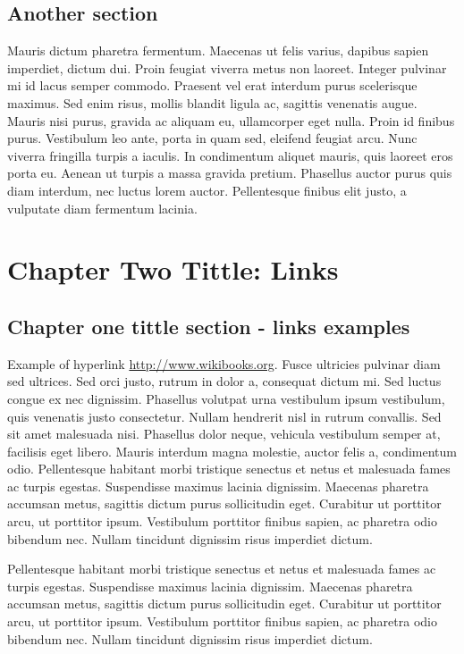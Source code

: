 \section{Another section}
Mauris dictum pharetra fermentum. Maecenas ut felis varius, dapibus sapien imperdiet, dictum dui. Proin feugiat viverra metus non laoreet. Integer pulvinar mi id lacus semper commodo. Praesent vel erat interdum purus scelerisque maximus. Sed enim risus, mollis blandit ligula ac, sagittis venenatis augue. Mauris nisi purus, gravida ac aliquam eu, ullamcorper eget nulla. Proin id finibus purus. Vestibulum leo ante, porta in quam sed, eleifend feugiat arcu. Nunc viverra fringilla turpis a iaculis. In condimentum aliquet mauris, quis laoreet eros porta eu. Aenean ut turpis a massa gravida pretium. Phasellus auctor purus quis diam interdum, nec luctus lorem auctor. Pellentesque finibus elit justo, a vulputate diam fermentum lacinia. 

\chapter{Chapter Two Tittle: Links}
\section{Chapter one tittle section - links examples}
Example of hyperlink \url{http://www.wikibooks.org}. Fusce ultricies pulvinar diam sed ultrices. Sed orci justo, rutrum in dolor a, consequat dictum mi. Sed luctus congue ex nec dignissim. Phasellus volutpat urna vestibulum ipsum vestibulum, quis venenatis justo consectetur. Nullam hendrerit nisl in rutrum convallis. Sed sit amet malesuada nisi. Phasellus dolor neque, vehicula vestibulum semper at, facilisis eget libero. Mauris interdum magna molestie, auctor felis a, condimentum odio. Pellentesque habitant morbi tristique senectus et netus et malesuada fames ac turpis egestas. Suspendisse maximus lacinia dignissim. Maecenas pharetra accumsan metus, sagittis dictum purus sollicitudin eget. Curabitur ut porttitor arcu, ut porttitor ipsum. Vestibulum porttitor finibus sapien, ac pharetra odio bibendum nec. Nullam tincidunt dignissim risus imperdiet dictum.

Pellentesque habitant morbi tristique senectus et netus et malesuada fames ac turpis egestas. Suspendisse maximus lacinia dignissim. Maecenas pharetra accumsan metus, sagittis dictum purus sollicitudin eget. Curabitur ut porttitor arcu, ut porttitor ipsum. Vestibulum porttitor finibus sapien, ac pharetra odio bibendum nec. Nullam tincidunt dignissim risus imperdiet dictum.
